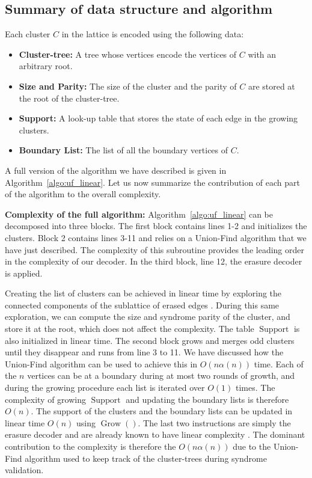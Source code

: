 \documentclass[a4paper, 10pt, accepted=2021-11-03]{quantumarticle}
\DeclareMathOperator{\Grow}{Grow}
\DeclareMathOperator{\Support}{Support}
\begin{document}
{\subsection{Summary of data structure and algorithm}

Each cluster $C$ in the lattice is encoded using the following data:
\begin{itemize}
\item {\bf Cluster-tree:} A tree whose vertices encode the vertices of $C$ with an arbitrary root.
\item {\bf Size and Parity:} The size of the cluster and the parity of $C$ are stored at the root of the cluster-tree.
\item {\bf Support:} A look-up table that stores the state of each edge in the growing clusters.
\item {\bf Boundary List:} The list of all the boundary vertices of $C$.
\end{itemize}

A full version of the algorithm we have described is given in Algorithm~\ref{algo:uf_linear}. Let us now summarize the contribution of each part of the algorithm to the overall complexity.

\medskip
{\bf Complexity of the full algorithm: } Algorithm~\ref{algo:uf_linear} 
can be decomposed into three blocks. 
The first block contains lines 1-2 and initializes the clusters.
Block 2 contains lines 3-11 and relies on a Union-Find algorithm that we have 
just described. The complexity of this subroutine provides the leading order in the complexity of 
our decoder. In the third block, line 12, the erasure decoder is applied. 

\medskip
Creating the list of clusters can be achieved in linear time by exploring the connected
components of the sublattice of erased edges \cite{hopcroft1973:graph_components_algo}.
During this same exploration, we can compute the size and syndrome parity of the cluster, and store it at 
the root, which does not affect the complexity. 
The table $\Support$ is also initialized in linear time.
The second block grows and merges odd clusters until they disappear and 
runs from line 3 to 11. We have discussed how the Union-Find algorithm can be used
to achieve this in $O(n \alpha(n))$ time. 
Each of the $n$ vertices can be at a boundary during at most two rounds of growth, and during 
the growing procedure each list is iterated over $O(1)$ times. 
The complexity of growing $\Support$ and updating the boundary
lists is therefore $O(n)$. 
The support of the clusters and the boundary lists can be updated in linear time $O(n)$
using $\Grow()$. 
The last two instructions are simply the erasure decoder and are already known 
to have linear complexity \cite{delfosse2017:linear_decoding}.
The dominant contribution to the complexity is therefore the $O(n \alpha(n))$ 
due to the Union-Find algorithm used to keep track of the cluster-trees during syndrome validation. 


}
\end{document}
